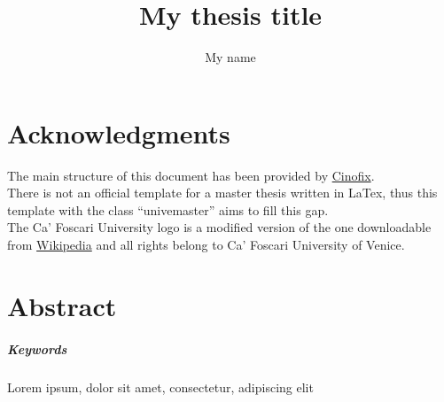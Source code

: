 \documentclass{univemaster}
\author{My name}
\title{My thesis title}
\begin{document}
    \maketitle

	
	\chapter*{Acknowledgments}
	The main structure of this document has been provided by \href{https://github.com/Cinofix/latex-scientific-templates}{Cinofix}.\\
	There is not an official template for a master thesis written in LaTex, thus this template with the class ``univemaster''
	aims to fill this gap.\\
	The Ca' Foscari University logo is a modified version of the one downloadable from 
	\href{https://commons.wikimedia.org/wiki/File:Logo_Universit\%C3\%A0_Ca\%27_Foscari_Venezia.svg}{Wikipedia} and all rights belong to Ca' Foscari University of Venice.
	
	
	\chapter*{Abstract}
    \lipsum[1-3]
	
	
	\paragraph{Keywords} 
    Lorem ipsum, dolor sit amet, consectetur, adipiscing elit
	
	\tableofcontents
	
	\clearpage
	
    \setcounter{page}{1}
    
	
	
	
	
	
	
	{\footnotesize
		
	}
	
	
\end{document}

